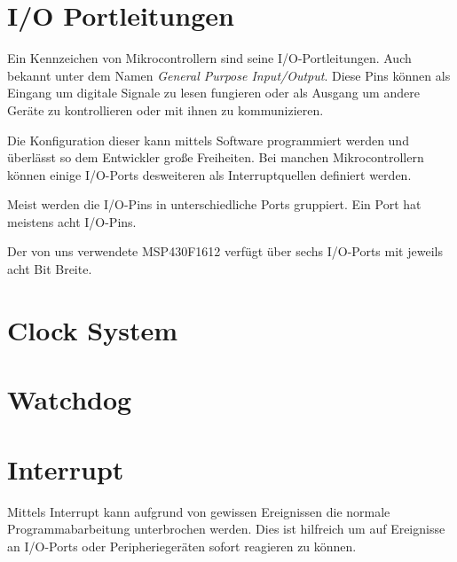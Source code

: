 \documentclass[11pt,german]{scrartcl}
\begin{document}

\clearpage
\section*{I/O Portleitungen}
Ein Kennzeichen von Mikrocontrollern sind seine I/O-Portleitungen.
Auch bekannt unter dem Namen \textit{General Purpose Input/Output}.
Diese Pins können als Eingang um digitale Signale zu lesen fungieren
oder als Ausgang um andere Geräte zu kontrollieren oder mit ihnen zu kommunizieren.

Die Konfiguration dieser kann mittels Software programmiert werden
und überlässt so dem Entwickler große Freiheiten.
Bei manchen Mikrocontrollern können einige I/O-Ports desweiteren als Interruptquellen definiert werden.

Meist werden die I/O-Pins in unterschiedliche Ports gruppiert.
Ein Port hat meistens acht I/O-Pins.

Der von uns verwendete MSP430F1612 verfügt über sechs I/O-Ports mit jeweils acht Bit Breite.








\clearpage
\section*{Clock System}






\clearpage
\section*{Watchdog}





\clearpage
\section*{Interrupt}
Mittels Interrupt kann aufgrund von gewissen Ereignissen die normale Programmabarbeitung unterbrochen werden.
Dies ist hilfreich um auf Ereignisse an I/O-Ports oder Peripheriegeräten sofort reagieren zu können.
\end{document}
